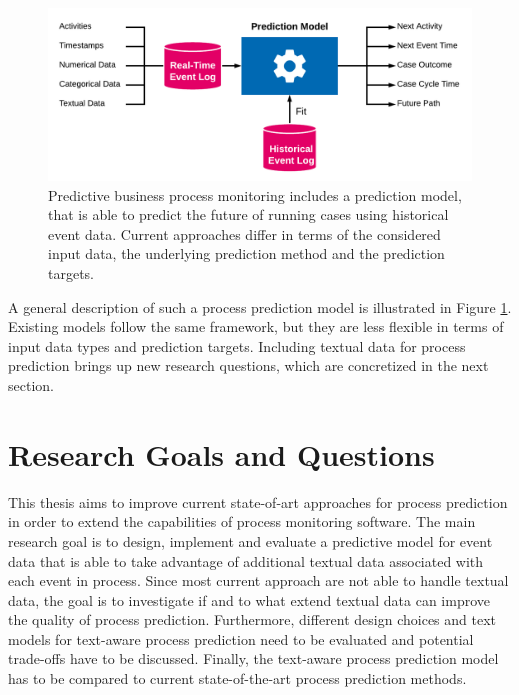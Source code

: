 \begin{figure}[htbp!]
	\centering
	\includegraphics[width=\textwidth]{figures/problem-description}
	\caption[General process prediction model]{Predictive business process monitoring includes a prediction model, that is able to predict the future of running cases using historical event data. Current approaches differ in terms of the considered input data, the underlying prediction method and the prediction targets.}
	\label{fig:/problem-description}
\end{figure}

A general description of such a process prediction model is illustrated in Figure \ref{fig:/problem-description}.
Existing models follow the same framework, but they are less flexible in terms of input data types and prediction targets.
Including textual data for process prediction brings up new research questions, which are concretized in the next section.

\section{Research Goals and Questions}\label{sec:technology}

This thesis aims to improve current state-of-art approaches for process prediction in order to extend the capabilities of process monitoring software.
The main research goal is to design, implement and evaluate a predictive model for event data that is able to take advantage of additional textual data associated with each event in process.
Since most current approach are not able to handle textual data, the goal is to investigate if and to what extend textual data can improve the quality of process prediction.
Furthermore, different design choices and text models for text-aware process prediction need to be evaluated and potential trade-offs have to be discussed.
Finally, the text-aware process prediction model has to be compared to current state-of-the-art process prediction methods.

